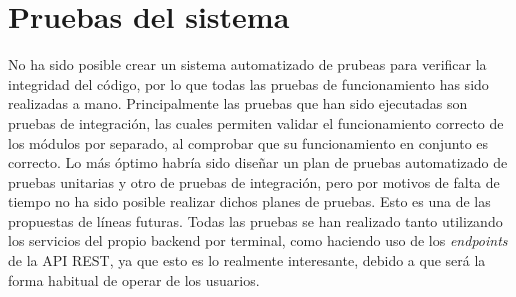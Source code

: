 \section{Pruebas del sistema}
No ha sido posible crear un sistema automatizado de prubeas para verificar la integridad del código, por lo que todas las pruebas de funcionamiento has sido realizadas a mano. Principalmente las pruebas que han sido ejecutadas son pruebas de integración, las cuales permiten validar el funcionamiento correcto de los módulos por separado, al comprobar que su funcionamiento en conjunto es correcto. 
Lo más óptimo habría sido diseñar un plan de pruebas automatizado de pruebas unitarias y otro de pruebas de integración, pero por motivos de falta de tiempo no ha sido posible realizar dichos planes de pruebas. Esto es una de las propuestas de líneas futuras.
Todas las pruebas se han realizado tanto utilizando los servicios del propio backend por terminal, como haciendo uso de los \textit{endpoints} de la API REST, ya que esto es lo realmente interesante, debido a que será la forma habitual de operar de los usuarios. 
